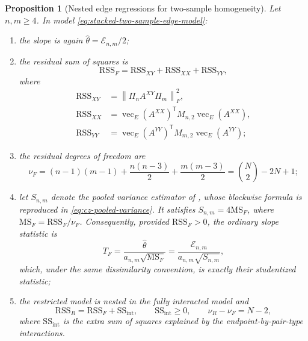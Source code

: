 \documentclass[11pt]{article}
\theoremstyle{plain}
\newtheorem{proposition}[theorem]{Proposition}
\theoremstyle{definition}
\theoremstyle{remark}
\newcommand{\norm}[1]{\left\lVert #1\right\rVert}
\begin{document}
\begin{proposition}[Nested edge regressions for two-sample homogeneity]
\label{prop:energy-anova-t}
Let $n,m\ge4$.  In model \eqref{eq:stacked-two-sample-edge-model}:
\begin{enumerate}
\item the slope is again $\widehat\theta=\mathcal E_{n,m}/2$;
\item the residual sum of squares is
\begin{equation}
 \mathrm{RSS}_F=\mathrm{RSS}_{XY}+\mathrm{RSS}_{XX}+\mathrm{RSS}_{YY},
 \label{eq:stacked-full-rss}
\end{equation}
where
\begin{align*}
 \mathrm{RSS}_{XY}
 &=\norm{\Pi_nA^{XY}\Pi_m}_F^2,\\
 \mathrm{RSS}_{XX}
 &=\operatorname{vec}_E(A^{XX})^\mathsf T
   M_{n,2}\operatorname{vec}_E(A^{XX}),\\
 \mathrm{RSS}_{YY}
 &=\operatorname{vec}_E(A^{YY})^\mathsf T
   M_{m,2}\operatorname{vec}_E(A^{YY});
\end{align*}
\item the residual degrees of freedom are
\begin{equation}
 \nu_F
 =(n-1)(m-1)+\frac{n(n-3)}2+\frac{m(m-3)}2
 =\binom N2-2N+1;
 \label{eq:stacked-two-sample-df}
\end{equation}
\item let $S_{n,m}$ denote the pooled variance estimator of
\citet{ChakrabortyZhang2021}, whose blockwise formula is reproduced in
\eqref{eq:cz-pooled-variance}.  It satisfies
$S_{n,m}=4\mathrm{MS}_F$, where
$\mathrm{MS}_F=\mathrm{RSS}_F/\nu_F$.  Consequently, provided
$\mathrm{RSS}_F>0$, the ordinary slope statistic is
\begin{equation}
 T_F=\frac{\widehat\theta}{a_{n,m}\sqrt{\mathrm{MS}_F}}
 =\frac{\mathcal E_{n,m}}{a_{n,m}\sqrt{S_{n,m}}},
 \label{eq:energy-anova-t}
\end{equation}
which, under the same dissimilarity convention, is
exactly their studentized statistic;
\item the restricted model is nested in the fully interacted model and
\begin{equation}
 \mathrm{RSS}_R=\mathrm{RSS}_F+\mathrm{SS}_{\mathrm{int}},
 \qquad
 \mathrm{SS}_{\mathrm{int}}\ge0,
 \qquad
 \nu_R-\nu_F=N-2,
 \label{eq:nested-rss-decomposition}
\end{equation}
where $\mathrm{SS}_{\mathrm{int}}$ is the extra sum of squares explained by
the endpoint-by-pair-type interactions.
\end{enumerate}
\end{proposition}
\end{document}
